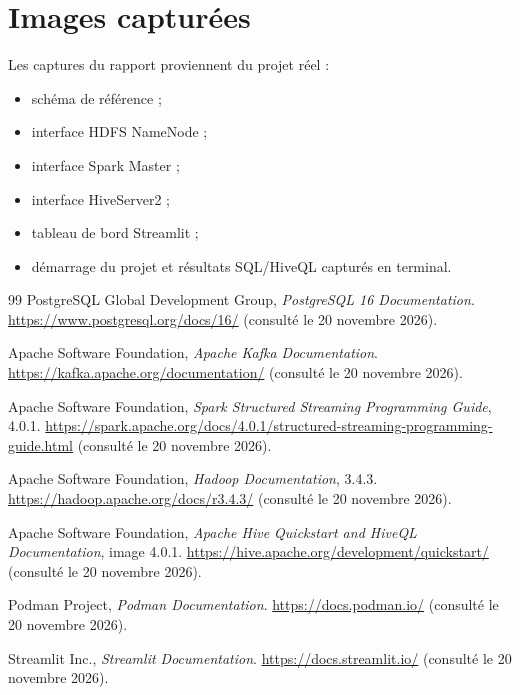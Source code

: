 \documentclass[11pt,a4paper]{report}
\begin{document}
\chapter{Images capturées}
Les captures du rapport proviennent du projet réel :
\begin{itemize}
\item schéma de référence ;
\item interface HDFS NameNode ;
\item interface Spark Master ;
\item interface HiveServer2 ;
\item tableau de bord Streamlit ;
\item démarrage du projet et résultats SQL/HiveQL capturés en terminal.
\end{itemize}

\begin{thebibliography}{99}
PostgreSQL Global Development Group, \emph{PostgreSQL 16 Documentation}.
\url{https://www.postgresql.org/docs/16/} (consulté le 20 novembre 2026).

Apache Software Foundation, \emph{Apache Kafka Documentation}.
\url{https://kafka.apache.org/documentation/} (consulté le 20 novembre 2026).

Apache Software Foundation, \emph{Spark Structured Streaming Programming Guide}, 4.0.1.
\url{https://spark.apache.org/docs/4.0.1/structured-streaming-programming-guide.html}
(consulté le 20 novembre 2026).

Apache Software Foundation, \emph{Hadoop Documentation}, 3.4.3.
\url{https://hadoop.apache.org/docs/r3.4.3/} (consulté le 20 novembre 2026).

Apache Software Foundation, \emph{Apache Hive Quickstart and HiveQL Documentation}, image 4.0.1.
\url{https://hive.apache.org/development/quickstart/} (consulté le 20 novembre 2026).

Podman Project, \emph{Podman Documentation}.
\url{https://docs.podman.io/} (consulté le 20 novembre 2026).

Streamlit Inc., \emph{Streamlit Documentation}.
\url{https://docs.streamlit.io/} (consulté le 20 novembre 2026).
\end{thebibliography}
\end{document}
